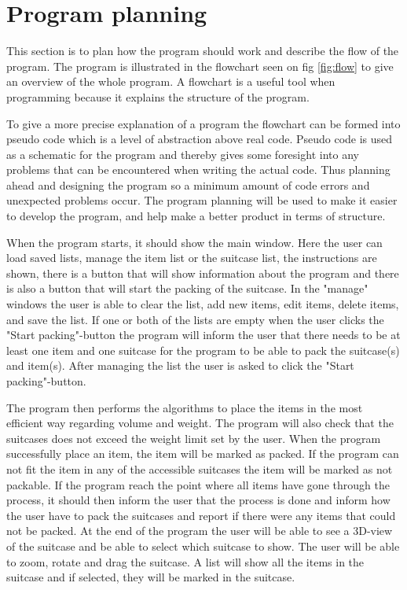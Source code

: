 \section{Program planning}
This section is to plan how the program should work and describe the flow of the program. The program is illustrated in the flowchart seen on fig \ref{fig:flow} to give an overview of the whole program. A flowchart is a useful tool when programming because it explains the structure of the program.

To give a more precise explanation of a program the flowchart can be formed into pseudo code which is a level of abstraction above real code. Pseudo code is used as a schematic for the program and thereby gives some foresight into any problems that can be encountered when writing the actual code. Thus planning ahead and designing the program so a minimum amount of code errors and unexpected problems occur.
The program planning will be used to make it easier to develop the program, and help make a better product in terms of structure.

When the program starts, it should show the main window. Here the user can load saved lists, manage the item list or the suitcase list, the instructions are shown, there is a button that will show information about the program and there is also a button that will start the packing of the suitcase. In the "manage" windows the user is able to clear the list, add new items, edit items, delete items, and save the list. If one or both of the lists are empty when the user clicks the "Start packing"-button the program will inform the user that there needs to be at least one item and one suitcase for the program to be able to pack the suitcase(s) and item(s). After managing the list the user is asked to click the "Start packing"-button.

The program then performs the algorithms to place the items in the most efficient way regarding volume and weight. The program will also check that the suitcases does not exceed the weight limit set by the user.
When the program successfully place an item, the item will be marked as packed. If the program can not fit the item in any of the accessible suitcases the item will be marked as not packable. If the program reach the point where all items have gone through the process, it should then inform the user that the process is done and inform how the user have to pack the suitcases and report if there were any items that could not be packed.
At the end of the program the user will be able to see a 3D-view of the suitcase and be able to select which suitcase to show. The user will be able to zoom, rotate and drag the suitcase. A list will show all the items in the suitcase and if selected, they will be marked in the suitcase.


